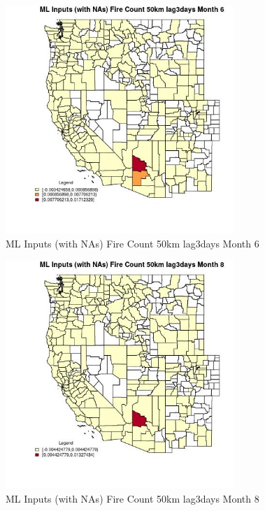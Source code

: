 \begin{figure} 
\centering  
\includegraphics[width=0.77\textwidth]{Code_Outputs/Report_ML_input_PM25_Step4_part_e_de_duplicated_aves_compiled_2019-05-21wNAs_CountyFire_Count_50km_lag3daysmedianMonth6.jpg} 
\caption{\label{fig:Report_ML_input_PM25_Step4_part_e_de_duplicated_aves_compiled_2019-05-21wNAsCountyFire_Count_50km_lag3daysmedianMonth6}ML Inputs (with NAs) Fire Count 50km lag3days Month 6} 
\end{figure} 
 

\begin{figure} 
\centering  
\includegraphics[width=0.77\textwidth]{Code_Outputs/Report_ML_input_PM25_Step4_part_e_de_duplicated_aves_compiled_2019-05-21wNAs_CountyFire_Count_50km_lag3daysmedianMonth8.jpg} 
\caption{\label{fig:Report_ML_input_PM25_Step4_part_e_de_duplicated_aves_compiled_2019-05-21wNAsCountyFire_Count_50km_lag3daysmedianMonth8}ML Inputs (with NAs) Fire Count 50km lag3days Month 8} 
\end{figure} 
 

